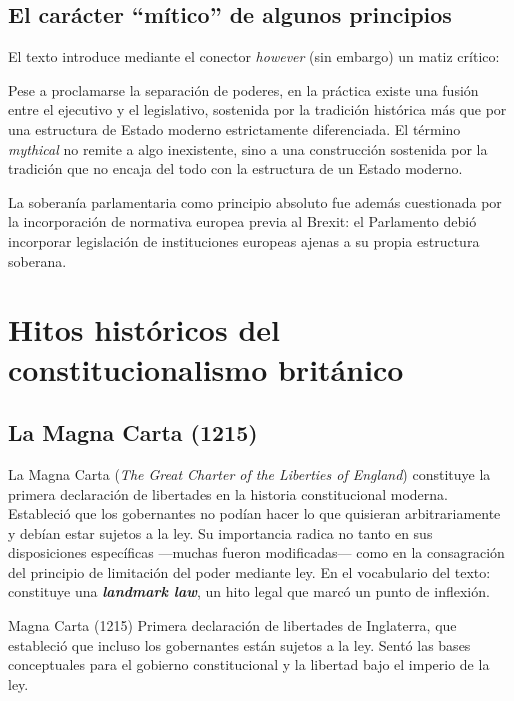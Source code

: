 \documentclass[12pt,oneside]{book}
\begin{document}
\subsection{El carácter ``mítico'' de algunos principios}

El texto introduce mediante el conector \textit{however} (sin embargo) un matiz crítico:

\begin{important}
Pese a proclamarse la separación de poderes, en la práctica existe una fusión entre el ejecutivo y el legislativo, sostenida por la tradición histórica más que por una estructura de Estado moderno estrictamente diferenciada. El término \textit{mythical} no remite a algo inexistente, sino a una construcción sostenida por la tradición que no encaja del todo con la estructura de un Estado moderno.

La soberanía parlamentaria como principio absoluto fue además cuestionada por la incorporación de normativa europea previa al Brexit: el Parlamento debió incorporar legislación de instituciones europeas ajenas a su propia estructura soberana.
\end{important}

\section{Hitos históricos del constitucionalismo británico}

\subsection{La Magna Carta (1215)}

La Magna Carta (\textit{The Great Charter of the Liberties of England}) constituye la primera declaración de libertades en la historia constitucional moderna. Estableció que los gobernantes no podían hacer lo que quisieran arbitrariamente y debían estar sujetos a la ley. Su importancia radica no tanto en sus disposiciones específicas ---muchas fueron modificadas--- como en la consagración del principio de limitación del poder mediante ley. En el vocabulario del texto: constituye una \textbf{\textit{landmark law}}, un hito legal que marcó un punto de inflexión.

\begin{definition}{Magna Carta (1215)}
Primera declaración de libertades de Inglaterra, que estableció que incluso los gobernantes están sujetos a la ley. Sentó las bases conceptuales para el gobierno constitucional y la libertad bajo el imperio de la ley.
\end{definition}
\end{document}
